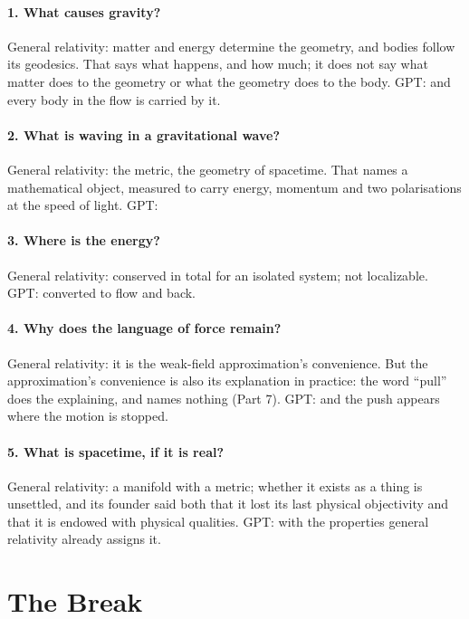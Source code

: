 \documentclass[11pt,a4paper]{article}
\begin{document}
\paragraph{1. What causes gravity?} General relativity: matter and energy determine the geometry, and bodies follow its geodesics. That says what happens, and how much; it does not say what matter does to the geometry or what the geometry does to the body. GPT:  and every body in the flow is carried by it.

\paragraph{2. What is waving in a gravitational wave?} General relativity: the metric, the geometry of spacetime. That names a mathematical object, measured to carry energy, momentum and two polarisations at the speed of light. GPT: 

\paragraph{3. Where is the energy?} General relativity: conserved in total for an isolated system; not localizable. GPT:  converted to flow and back.

\paragraph{4. Why does the language of force remain?} General relativity: it is the weak-field approximation's convenience. But the approximation's convenience is also its explanation in practice: the word ``pull'' does the explaining, and names nothing (Part 7). GPT:  and the push appears where the motion is stopped.

\paragraph{5. What is spacetime, if it is real?} General relativity: a manifold with a metric; whether it exists as a thing is unsettled, and its founder said both that it lost its last physical objectivity and that it is endowed with physical qualities. GPT:  with the properties general relativity already assigns it.

\section{The Break}
\end{document}
